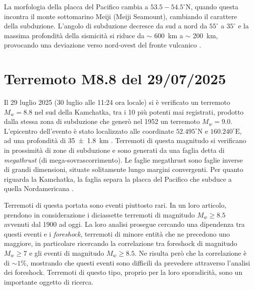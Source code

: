 La morfologia della placca del Pacifico cambia a \(53.5-54.5 ^\circ \text{N}\), quando questa incontra il monte sottomarino Meiji (Meiji Seamount), cambiando il carattere della subduzione. L'angolo di subduzione decresce da sud a nord da \(55 ^\circ\) a \(35 ^\circ\) e la massima profondità della sismicità si riduce da \(\sim\) \qty{600}{\kilo\meter} a \(\sim\) \qty{200}{\kilo\meter}, provocando una deviazione verso nord-ovest del fronte vulcanico \citep{description, usgs2025qw60}.


\section{Terremoto M8.8 del 29/07/2025}

Il 29 luglio 2025 (30 luglio alle 11:24 ora locale) si è verificato un terremoto \(M_w = 8.8\) nel sud della Kamchatka, tra i 10 più potenti mai registrati, prodotto dalla stessa zona di subduzione che generò nel 1952 un terremoto \(M_w = 9.0\).
L'epicentro dell'evento è stato localizzato alle coordinate \(52.495^\circ \text{N}\) e \(160.240^\circ \text{E}\), ad una profondità di \qty{35 +- 1.8}{\kilo\meter} \citep{usgs2025qw60}.
Terremoti di questa magnitudo si verificano in prossimità di zone di subduzione e sono generati da una faglia detta di \textit{megathrust} (di mega-sovrascorrimento). Le faglie megathrust sono faglie inverse di grandi dimensioni, situate solitamente lungo margini convergenti. Per quanto riguarda la Kamchatka, la faglia separa la placca del Pacifico che subduce a quella Nordamericana \citep{hubbardstrikeskamchatka}. 

Terremoti di questa portata sono eventi piuttosto rari. In un loro articolo, \citet{hubbardfirstlook} prendono in considerazione i diciassette terremoti di magnitudo \(M_w \ge 8.5\) avvenuti dal 1900 ad oggi. La loro analisi prosegue cercando una dipendenza tra questi eventi e i \textit{foreshock}, terremoti di minore entità che ne precedono uno maggiore, in particolare ricercando la correlazione tra foreshock di magnitudo \(M_w \ge 7\) e gli eventi di magnitudo  \(M_w \ge 8.5\).
Ne risulta però che la correlazione è di \(\sim1 \%\), mostrando che questi eventi sono difficili da prevedere attraverso l'analisi dei foreshock. 
Terremoti di questo tipo, proprio per la loro sporadicità, sono un importante oggetto di ricerca.

